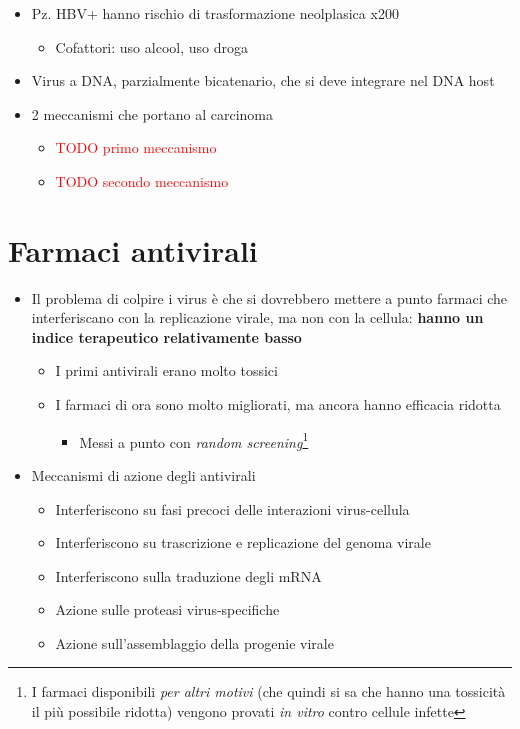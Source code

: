 \documentclass[italian,]{article}
\providecommand{\tightlist}{%
  \setlength{\itemsep}{0pt}\setlength{\parskip}{0pt}}
\newcommand{\TODO}[1]{\textcolor{red}{\textsf{\footnotesize{TODO #1}}}} %
\begin{document}
\begin{itemize}
\tightlist
\item
  Pz. HBV+ hanno rischio di trasformazione neolplasica x200

  \begin{itemize}
  \tightlist
  \item
    Cofattori: uso alcool, uso droga
  \end{itemize}
\item
  Virus a DNA, parzialmente bicatenario, che si deve integrare nel DNA
  host
\item
  2 meccanismi che portano al carcinoma

  \begin{itemize}
  \item
    \TODO{primo meccanismo}
  \item
    \TODO{secondo meccanismo}
  \end{itemize}
\end{itemize}

\hypertarget{farmaci-antivirali}{%
\section{Farmaci antivirali}\label{farmaci-antivirali}}

\begin{itemize}
\tightlist
\item
  Il problema di colpire i virus è che si dovrebbero mettere a punto
  farmaci che interferiscano con la replicazione virale, ma non con la
  cellula: \textbf{hanno un indice terapeutico relativamente basso}

  \begin{itemize}
  \tightlist
  \item
    I primi antivirali erano molto tossici
  \item
    I farmaci di ora sono molto migliorati, ma ancora hanno efficacia
    ridotta

    \begin{itemize}
    \tightlist
    \item
      Messi a punto con \emph{random screening}\footnote{I farmaci
        disponibili \emph{per altri motivi} (che quindi si sa che hanno
        una tossicità il più possibile ridotta) vengono provati \emph{in
        vitro} contro cellule infette}
    \end{itemize}
  \end{itemize}
\item
  Meccanismi di azione degli antivirali

  \begin{itemize}
  \tightlist
  \item
    Interferiscono su fasi precoci delle interazioni virus-cellula
  \item
    Interferiscono su trascrizione e replicazione del genoma virale
  \item
    Interferiscono sulla traduzione degli mRNA
  \item
    Azione sulle proteasi virus-specifiche
  \item
    Azione sull'assemblaggio della progenie virale
  \end{itemize}
\end{itemize}
\end{document}
